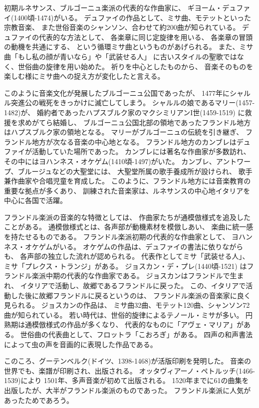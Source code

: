 \documentclass[a4j]{jarticle}
\begin{document}
初期ルネサンス、ブルゴーニュ楽派の代表的な作曲家に、
ギヨーム・デュファイ(1400頃-1474)がいる。
デュファイの作品として、ミサ曲、モテットといった宗教音楽、
また世俗音楽のシャンソン、合わせて約200曲が知られている。
デュファイの代表的な方法として、
各楽章に同じ定旋律を用いる、
各楽章の冒頭の動機を共通にする、
という循環ミサ曲というものがあげられる。
また、ミサ曲「もし私の顔が青いなら」や「武装せる人」
に古いスタイルの聖歌ではなく、世俗曲の旋律を用い始めた。
祈りを中心としたものから、
音楽そのものを楽しむ様にミサ曲への捉え方が変化したと言える。

このように音楽文化が発展したブルゴーニュ公国であったが、
1477年にシャルル突進公の戦死をきっかけに滅亡してしまう。
シャルルの娘であるマリー(1457-1482)が、
婚約者であったハプスブルク家のマクシミリアンI世(1459-1519)
に救援を求めがてら結婚し、
ブルゴーニュ公国北部の領地であったフランドル地方はハプスブルク家の領地となる。
マリーがブルゴーニュの伝統を引き継ぎ、
フランドル地方が次なる音楽の中心地となる。
フランドル地方のカンブレはデュファイが活動していた場所であった。
カンブレには著名な作曲家が多数訪れ、
その中にはヨハンネス・オケゲム(1410頃-1497)がいた。
カンブレ、アントワープ、ブルージュなどの大聖堂には、
大聖堂所属の歌手養成所が設けられ、
歌手兼作曲家や合唱児童を育成した。
このように、フランドル地方には音楽教育の重要な拠点が多くあり、
訓練された音楽家は、ルネサンスの中心地イタリアを中心に各国で活躍。

フランドル楽派の音楽的な特徴としては、
作曲家たちが通模倣様式を追及したことがある。
通模倣様式とは、各声部が動機素材を模倣しあい、
楽曲に統一感を持たせるものである。
フランドル楽派初期の代表的な作曲家として、
ヨハンネス・オケゲムがいる。
オケゲムの作品は、デュファイの書法に依りながらも、
各声部の独立した流れが認められる。
代表作としてミサ「武装せる人」、
ミサ「プレクス・トランジ」がある。
ジョスカン・デ・プレ(1440頃-1521)
はフランドル楽派中期の代表的な作曲家である。
ジョスカンはフランドルで生まれ、
イタリアで活動し、故郷であるフランドルに戻った。
この、イタリアで活動した後に故郷フランドルに戻るというのは、
フランドル楽派の音楽家に良く見られる。
ジョスカンの作品は、
ミサ曲32曲、モテット120曲、シャンソン72曲が知られている。
若い時代は、世俗的旋律によるテノール・ミサが多い。
円熟期は通模倣様式の作品が多くなり、
代表的なものに「アヴェ・マリア」がある。
世俗曲の代表曲として、フロットラ「こおろぎ」がある。
四声の和声書法によって虫の声を音画的に表現した作品である。

このころ、グーテンベルク(ドイツ、1398-1468)が活版印刷を発明した。
音楽の世界でも、楽譜が印刷され、出版される。
オッタヴィアーノ・ペトルッチ(1466-1539)により
1501年、多声音楽が初めて出版される。
1520年までに61の曲集を出版したが、大半がフランドル楽派のものであった。
フランドル楽派に人気があったためであろう。
\end{document}
